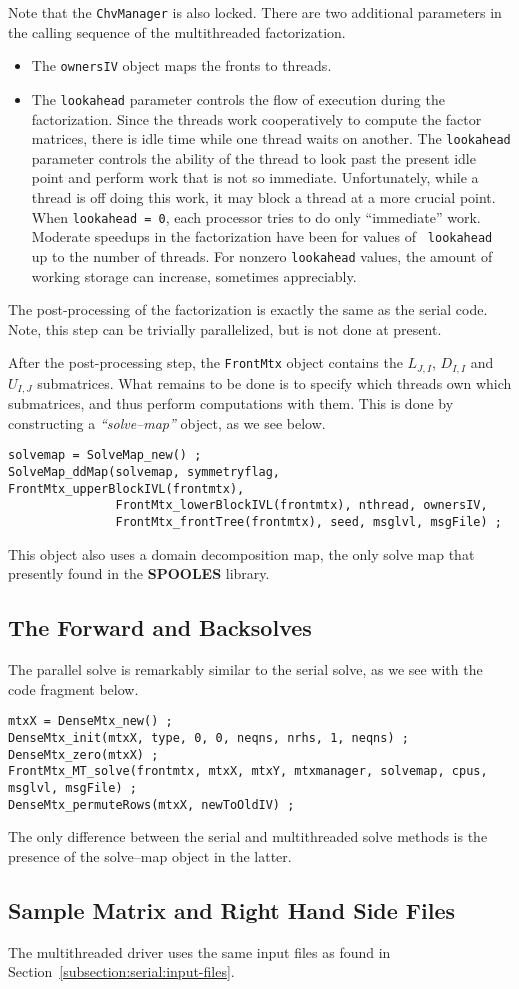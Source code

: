 Note that the {\tt ChvManager} is also locked.
There are two additional parameters in the calling sequence of
the multithreaded factorization.
\begin{itemize}
\item
The {\tt ownersIV} object maps the fronts to threads.
\item
The {\tt lookahead} parameter controls the flow of execution during
the factorization.
Since the threads work cooperatively to compute the factor
matrices, there is idle time while one thread waits on another.
The {\tt lookahead} parameter controls the ability of the thread to
look past the present idle point and perform work that is not so
immediate.
Unfortunately, while a thread is off doing this work, it may block
a thread at a more crucial point.
When {\tt lookahead = 0}, each processor tries to do only
``immediate'' work.
Moderate speedups in the factorization have been for values of {\tt
lookahead} up to the number of threads.
For nonzero {\tt lookahead} values, the amount of working storage
can increase, sometimes appreciably.
\end{itemize}
The post-processing of the factorization is exactly the same as the
serial code.
Note, this step can be trivially parallelized, but is not done at
present.
\par
After the post-processing step, the {\tt FrontMtx} object contains
the $L_{J,I}$, $D_{I,I}$ and $U_{I,J}$ submatrices.
What remains to be done is to specify which threads own which
submatrices, and thus perform computations with them.
This is done by constructing a {\it ``solve--map''} object,
as we see below.
\begin{verbatim}
solvemap = SolveMap_new() ;
SolveMap_ddMap(solvemap, symmetryflag, FrontMtx_upperBlockIVL(frontmtx),
               FrontMtx_lowerBlockIVL(frontmtx), nthread, ownersIV,
               FrontMtx_frontTree(frontmtx), seed, msglvl, msgFile) ;
\end{verbatim}
This object also uses a domain decomposition map, the only solve map
that presently found in the {\bf SPOOLES} library.
\par
\subsection{The Forward and Backsolves}
\label{subsection:MT:solve}
\par
The parallel solve is remarkably similar to the serial solve,
as we see with the code fragment below.
\begin{verbatim}
mtxX = DenseMtx_new() ;
DenseMtx_init(mtxX, type, 0, 0, neqns, nrhs, 1, neqns) ;
DenseMtx_zero(mtxX) ;
FrontMtx_MT_solve(frontmtx, mtxX, mtxY, mtxmanager, solvemap, cpus, msglvl, msgFile) ;
DenseMtx_permuteRows(mtxX, newToOldIV) ;
\end{verbatim}
The only difference between the serial and multithreaded solve
methods is the presence of the solve--map object in the latter.
\par
\subsection{Sample Matrix and Right Hand Side Files}
\label{subsection:MT:input-files}
\par
The multithreaded driver uses the same input files as found in 
Section~\ref{subsection:serial:input-files}.

